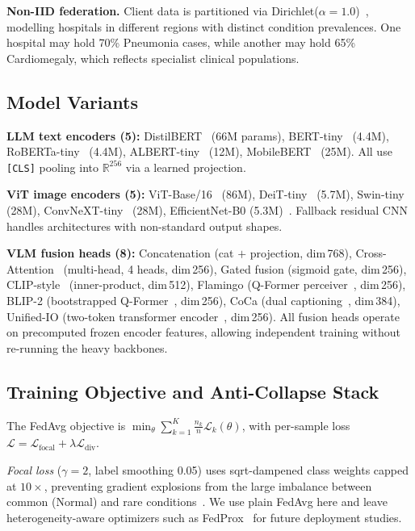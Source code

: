 \documentclass[conference]{IEEEtran}
\begin{document}
\textbf{Non-IID federation.}
Client data is partitioned via Dirichlet($\alpha{=}1.0$)~\cite{Hsu2019},
modelling hospitals in different regions with distinct condition
prevalences. One hospital may hold 70\% Pneumonia cases, while another
may hold 65\% Cardiomegaly, which reflects specialist clinical populations.

\subsection{Model Variants}

\textbf{LLM text encoders (5):} DistilBERT~\cite{Sanh2019}
(66M params), BERT-tiny~\cite{Devlin2019} (4.4M),
RoBERTa-tiny~\cite{Liu2019roberta} (4.4M),
ALBERT-tiny~\cite{Lan2020} (12M), MobileBERT~\cite{Sun2020} (25M).
All use \texttt{[CLS]}
pooling into $\mathbb{R}^{256}$ via a learned projection.

\textbf{ViT image encoders (5):} ViT-Base/16~\cite{Dosovitskiy2021}
(86M), DeiT-tiny~\cite{Touvron2021} (5.7M), Swin-tiny~\cite{Liu2021swin}
(28M), ConvNeXT-tiny~\cite{Liu2022convnext} (28M), EfficientNet-B0
(5.3M)~\cite{Tan2019}. Fallback residual CNN handles architectures
with non-standard output shapes.

\textbf{VLM fusion heads (8):} Concatenation (cat $+$ projection,
dim\,768), Cross-Attention~\cite{Vaswani2017} (multi-head, 4 heads,
dim\,256), Gated fusion (sigmoid gate, dim\,256),
CLIP-style~\cite{Radford2021} (inner-product, dim\,512),
Flamingo (Q-Former perceiver~\cite{Alayrac2022}, dim\,256),
BLIP-2 (bootstrapped Q-Former~\cite{Li2023blip}, dim\,256), CoCa
(dual captioning~\cite{Yu2022}, dim\,384), Unified-IO (two-token
transformer encoder~\cite{Lu2022}, dim\,256). All fusion heads operate
on precomputed frozen encoder features, allowing independent training
without re-running the heavy backbones.

\subsection{Training Objective and Anti-Collapse Stack}

The FedAvg objective is
$\min_\theta\sum_{k=1}^{K}\frac{n_k}{n}\mathcal{L}_k(\theta)$,
with per-sample loss
$\mathcal{L}{=}\mathcal{L}_{\text{focal}}+\lambda\mathcal{L}_{\text{div}}$.

\textit{Focal loss} ($\gamma{=}2$, label smoothing 0.05) uses
sqrt-dampened class weights capped at $10{\times}$, preventing gradient
explosions from the large imbalance between common (Normal) and rare
conditions~\cite{Lin2017}. We use plain FedAvg here and leave
heterogeneity-aware optimizers such as FedProx~\cite{Li2020fedprox} for
future deployment studies.
\end{document}
